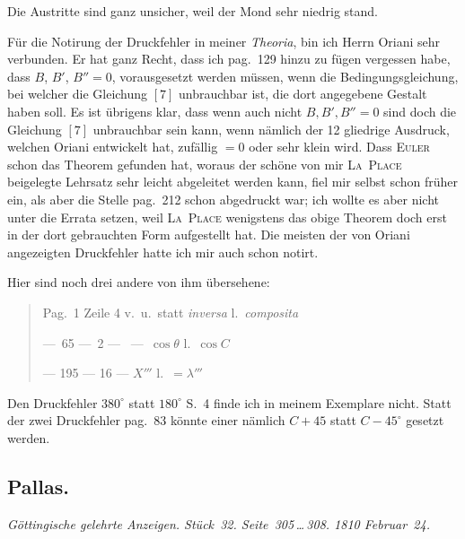 \documentclass[12pt,a4paper]{book}
\begin{document}
Die Austritte sind ganz unsicher, weil der Mond sehr niedrig stand.

F\"ur die Notirung der Druckfehler in meiner \textit{Theoria}, bin ich Herrn Oriani sehr verbunden. Er hat ganz Recht, dass ich pag.~129 hinzu zu f\"ugen vergessen habe, dass $B$, $B'$, $B'' = 0$, vorausgesetzt werden m\"ussen, wenn die Bedingungsgleichung, bei welcher die Gleichung $[7]$ unbrauchbar ist, die dort angegebene Gestalt haben soll. Es ist \"ubrigens klar, dass wenn auch nicht $B, B', B'' = 0$ sind doch die Gleichung $[7]$ unbrauchbar sein kann, wenn n\"amlich der 12 gliedrige Ausdruck, welchen Oriani entwickelt hat, zuf\"allig $=0$ oder sehr klein wird. Dass \textsc{Euler} schon das Theorem gefunden hat, woraus der sch\"one von mir \textsc{La~Place} beigelegte Lehrsatz sehr leicht abgeleitet werden kann, fiel mir selbst schon fr\"uher ein, als aber die Stelle pag.~212 schon abgedruckt war; ich wollte es aber nicht unter die Errata setzen, weil \textsc{La~Place} wenigstens das obige Theorem doch erst in der dort gebrauchten Form aufgestellt hat. Die meisten der von Oriani angezeigten Druckfehler hatte ich mir auch schon notirt.

Hier sind noch drei andere von ihm \"ubersehene:

\begin{quote}
Pag.\ \phantom{1}1 Zeile 4 v.~u.\ statt \textit{inversa} l.\ \textit{composita}

---\ \phantom{1}65 ---\ \phantom{1}2 ---\ \phantom{---} ---\ $\cos\theta$ l.\ $\cos C$

--- 195 --- 16 --- $X'''$ l.\ $=\lambda'''$
\end{quote}

Den Druckfehler $380^{\circ}$ statt $180^{\circ}$ S.~4 finde ich in meinem Exemplare nicht. Statt der zwei Druckfehler pag.~83 k\"onnte einer n\"amlich $C+45$ statt $C-45^{\circ}$ gesetzt werden.


\newpage
\subsection*{Pallas.}

\textit{G\"ottingische gelehrte Anzeigen. St\"uck~32. Seite~305\,\ldots\,308. 1810 Februar~24.}
\end{document}
